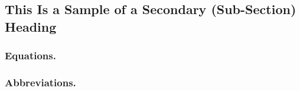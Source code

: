 \documentclass[letterpaper, preprint, paper,11pt]{AAS}	%
\begin{document}
\subsection{This Is a Sample of a Secondary (Sub-Section) Heading}

\subsubsection{Equations.} 



\subsubsection{Abbreviations.}
%
%
%
%
\end{document}
